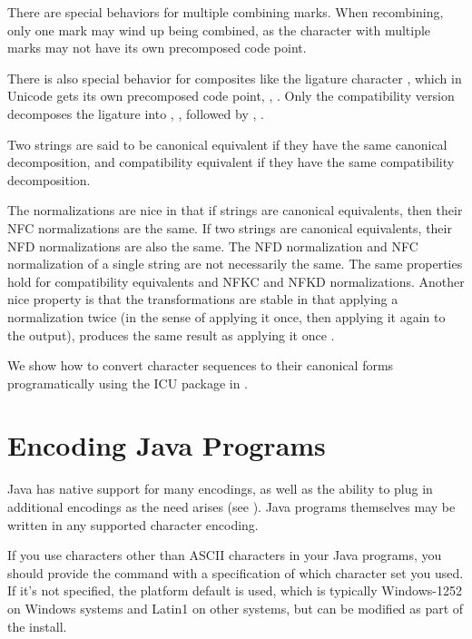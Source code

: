 There are special behaviors for multiple combining marks.  When
recombining, only one mark may wind up being combined, as the
character with multiple marks may not have its own precomposed code
point.  

There is also special behavior for composites like the ligature
character , which in Unicode gets its own precomposed
code point, , .
Only the compatibility version decomposes the ligature into
, , followed by ,
.

Two strings are said to be canonical equivalent if they have
the same canonical decomposition, and compatibility equivalent
if they have the same compatibility decomposition.  

The normalizations are nice in that if strings are canonical
equivalents, then their NFC normalizations are the same.  If two
strings are canonical equivalents, their NFD normalizations are also
the same.  The NFD normalization and NFC normalization of a single
string are not necessarily the same.  The same properties hold for
compatibility equivalents and NFKC and NFKD normalizations.  Another
nice property is that the transformations are stable in that applying
a normalization twice (in the sense of applying it once, then applying
it again to the output), produces the same result as applying it
once . 

We show how to convert character sequences to their canonical forms
programatically using the ICU package in .


\section{Encoding Java Programs}

Java has native support for many encodings, as well as the ability to
plug in additional encodings as the need arises (see
).  Java programs themselves may be
written in any supported character encoding.

If you use characters other than ASCII characters in your Java
programs, you should provide the  command with a
specification of which character set you used.  If it's not specified,
the platform default is used, which is typically Windows-1252 on
Windows systems and Latin1 on other systems, but can be modified as
part of the install.  

